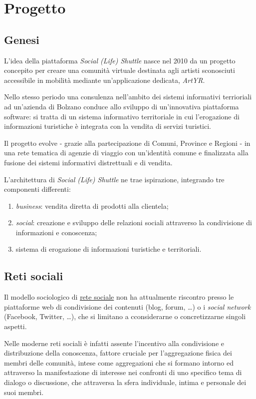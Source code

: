 \chapter{Progetto}
\label{ch:tesi:progetto}

\section{Genesi}
\label{sec:progetto:genesi}
L'idea della piattaforma \textit{Social (Life) Shuttle} nasce nel 2010 da un progetto concepito per creare una comunità virtuale destinata agli artisti sconosciuti accessibile in mobilità mediante un'applicazione dedicata, \textit{ArtYR}.

Nello stesso periodo una consulenza nell'ambito dei sistemi informativi terrioriali ad un'azienda di Bolzano conduce allo sviluppo di un'innovativa piattaforma software: si tratta di un sistema informativo territoriale in cui l'erogazione di informazioni turistiche è integrata con la vendita di servizi turistici.

Il progetto evolve - grazie alla partecipazione di Comuni, Province e Regioni - in una rete tematica di agenzie di viaggio con un'identità comune e finalizzata alla fusione dei sistemi informativi distrettuali e di vendita.

L'architettura di \textit{Social (Life) Shuttle} ne trae ispirazione, integrando tre componenti differenti:
\begin{enumerate}
	\item \textit{business}: vendita diretta di prodotti alla clientela;
	\item \textit{social}: creazione e sviluppo delle relazioni sociali attraverso la condivisione di informazioni e conoscenza;
	\item sistema di erogazione di informazioni turistiche e territoriali.
\end{enumerate}

\section{Reti sociali}
\label{sec:tesi:progetto:reti-sociali}
Il modello sociologico di \underline{rete sociale} non ha attualmente riscontro presso le piattaforme web di condivisione dei contenuti (blog, forum, \ldots) o i \textit{social network} (Facebook, Twitter, \ldots), che si limitano a cconsiderarne o concretizzarne singoli aspetti.

Nelle moderne reti sociali è infatti assente l'incentivo alla condivisione e distribuzione della conoscenza, fattore cruciale per l'aggregazione fisica dei membri delle comunità, intese come aggregazioni che si formano intorno ed attraverso la manifestazione di interesse nei confronti di uno specifico tema di dialogo o discussione, che attraversa la sfera individuale, intima e personale dei suoi membri.

